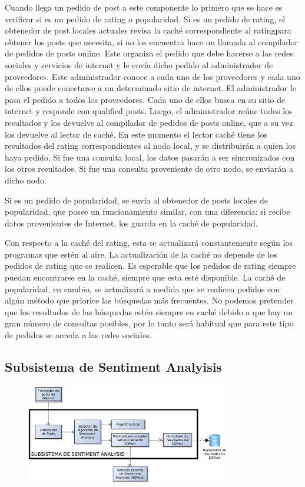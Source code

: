 Cuando llega un pedido de post a este componente lo primero que se hace es verificar si es un pedido de rating o popularidad. 
Si es un pedido de rating, el obtenedor de post locales actuales revisa la caché correspondiente al ratingpara obtener los posts que necesita, si no los encuentra hace un llamada al compilador de pedidos de posts online. Este organiza el pedido que debe hacerse a las redes sociales y servicios de internet y le envía dicho pedido al administrador de proveedores. Este administrador conoce a cada uno de los proveedores y cada uno de ellos puede conectarse a un determinado sitio de internet. El administrador le pasa el pedido a todos los proveedores. Cada uno de ellos busca en su sitio de internet y responde con qualified posts. Luego, el administrador reúne todos los resultados y los devuelve al compilador de pedidos de posts online, que a su vez los devuelve al lector de caché. En este momento el lector caché tiene los resultados del rating correspondientes al nodo local, y se distribuirán a quien los haya pedido. Si fue una consulta local, los datos pasarán a ser sincronizados con los otros resultados. Si fue una consulta proveniente de otro nodo, se enviarán a dicho nodo.

Si es un pedido de popularidad, se envía al obtenedor de posts locales de popularidad, que posee un funcionamiento similar, con una diferencia: si recibe datos provenientes de Internet, los guarda en la caché de popularidad.

Con respecto a la caché del rating, esta se actualizará constantemente según los programas que estén al aire. La actualización de la caché no depende de los pedidos de rating que se realicen. Es esperable que los pedidos de rating siempre puedan encontrarse en la caché, siempre que esta esté disponible.
La caché de popularidad, en cambio, se actualizará a medida que se realicen pedidos con algún método que priorice las búsquedas más frecuentes. No podemos pretender que los resultados de las búsquedas estén siempre en caché debido a que hay un gran número de consultas posibles, por lo tanto será habitual que para este tipo de pedidos se acceda a las redes sociales. 

\subsection{Subsistema de Sentiment Analyisis}

\begin{figure}[H]
\centering
\includegraphics[width=0.8\textwidth]{graph/subsistemaSentimentAnalysis.pdf}
\end{figure}

